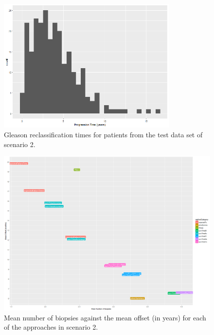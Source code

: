\begin{figure}[H]
\centering
\captionsetup{justification=centering}
\includegraphics[width=0.8\textwidth]{sim_study_res_sc_6_sh_1pt5/progression_hist.png}
\caption{\label{fig : sc_6_sh_1pt5_progression_hist} Gleason reclassification times for patients from the test data set of scenario 2.}
\end{figure}

\begin{figure}[H]
\centering
\captionsetup{justification=centering}
\includegraphics[width=\textwidth]{sim_study_res_sc_6_sh_1pt5/mean_offsetvsnb.png}
\caption{\label{fig : sc_6_sh_1pt5_mean_offsetvsnb} Mean number of biopsies against the mean offset (in years) for each of the approaches in scenario 2.}
\end{figure}

